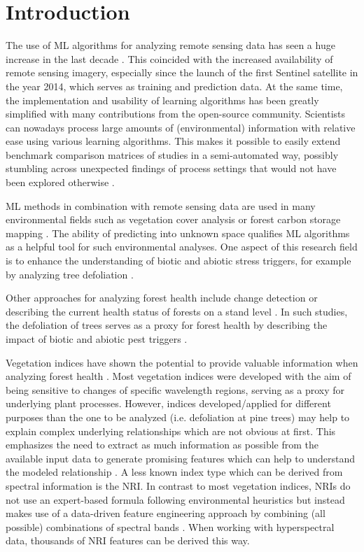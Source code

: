 \documentclass[remotesensing,article,submit,moreauthors,pdftex]{Definitions/mdpi}
\begin{document}
\section{Introduction}

The use of \ac{ML} algorithms for analyzing remote sensing data has seen a huge increase in the last decade \cite{lary2016}.
This coincided with the increased availability of remote sensing imagery, especially since the launch of the first Sentinel satellite in the year 2014, which serves as training and prediction data.
At the same time, the implementation and usability of learning algorithms has been greatly simplified with many contributions from the open-source community.
Scientists can nowadays process large amounts of (environmental) information with relative ease using various learning algorithms.
This makes it possible to easily extend benchmark comparison matrices of studies in a semi-automated way, possibly stumbling across unexpected findings of process settings that would not have been explored otherwise \cite{ma2015}.


ML methods in combination with remote sensing data are used in many environmental fields such as vegetation cover analysis or forest carbon storage mapping \cite{mascaro2014, urban2018}.
The ability of predicting into unknown space qualifies ML algorithms as a helpful tool for such environmental analyses.
One aspect of this research field is to enhance the understanding of biotic and abiotic stress triggers, for example by analyzing tree defoliation \cite{hawrylo2018}.

Other approaches for analyzing forest health include change detection \cite{zhang2016} or describing the current health status of forests on a stand level \cite{townsend2012}.
In such studies, the defoliation of trees serves as a proxy for forest health by describing the impact of biotic and abiotic pest triggers \cite{townsend2012, goodbody2018}.

Vegetation indices have shown the potential to provide valuable information when analyzing forest health \cite{jiang2014, adamczyk2015}.
Most vegetation indices were developed with the aim of being sensitive to changes of specific wavelength regions, serving as a proxy for underlying plant processes.
However, indices developed/applied for different purposes than the one to be analyzed (i.e. defoliation at pine trees) may help to explain complex underlying relationships which are not obvious at first.
This emphasizes the need to extract as much information as possible from the available input data to generate promising features which can help to understand the modeled relationship \cite{thenkabail2018}.
A less known index type which can be derived from spectral information is the \ac{NRI}.
In contrast to most vegetation indices, \ac{NRI}s do not use an expert-based formula following environmental heuristics but instead makes use of a data-driven feature engineering approach by combining (all possible) combinations of spectral bands \cite{thenkabail2000}.
When working with hyperspectral data, thousands of \ac{NRI} features can be derived this way.
\end{document}
